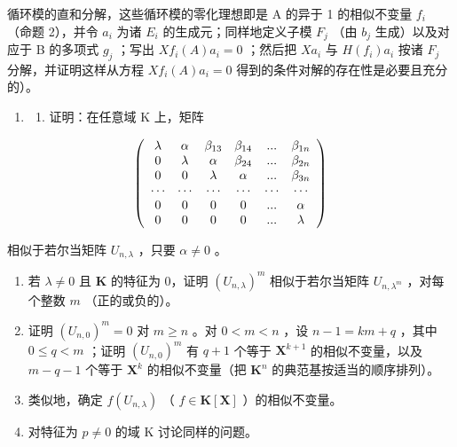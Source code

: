循环模的直和分解，这些循环模的零化理想即是 A 的异于 1 的相似不变量 \(f_{i}\) （命题 2），并令 \(a_{i}\) 为诸 \(E_{i}\) 的生成元；同样地定义子模 \(F_{j}\) （由 \(b_{j}\) 生成）以及对应于 B 的多项式 \(g_{j}\) ；写出 \(Xf_{i}(A)a_{i}=0\) ；然后把 \(Xa_{i}\) 与 \(H(f_{i})a_{i}\) 按诸 \(F_{j}\) 分解，并证明这样从方程 \(Xf_{i}(A)a_{i}=0\) 得到的条件对解的存在性是必要且充分的）。

\begin{enumerate}
\def\labelenumi{\arabic{enumi})}
\setcounter{enumi}{9}
\tightlist
\item
  \begin{enumerate}
  \def\labelenumii{\alph{enumii})}
  \tightlist
  \item
    证明：在任意域 K 上，矩阵
  \end{enumerate}
\end{enumerate}

\[
\left( \begin{array}{c c c c c c} \lambda & \alpha & \beta_ {13} & \beta_ {14} & ... & \beta_ {1n} \\ 0 & \lambda & \alpha & \beta_ {24} & ... & \beta_ {2n} \\ 0 & 0 & \lambda & \alpha & ... & \beta_ {3n} \\ \cdots & \cdots & \cdots & \cdots & \cdots & \cdots \\ 0 & 0 & 0 & 0 & ... & \alpha \\ 0 & 0 & 0 & 0 & ... & \lambda \end{array} \right)
\]

相似于若尔当矩阵 \(U_{n,\lambda}\) ，只要 \(\alpha \neq 0\) 。

\begin{enumerate}
\def\labelenumi{\alph{enumi})}
\setcounter{enumi}{1}
\item
  若 \(\lambda \neq 0\) 且 \(\mathbf{K}\) 的特征为 0，证明 \((U_{n,\lambda})^m\) 相似于若尔当矩阵 \(U_{n,\lambda^m}\) ，对每个整数 \(m\) （正的或负的）。
\item
  证明 \((U_{n,0})^m = 0\) 对 \(m \geqslant n\) 。对 \(0 < m < n\) ，设 \(n - 1 = km + q\) ，其中 \(0 \leqslant q < m\) ；证明 \((U_{n,0})^m\) 有 \(q + 1\) 个等于 \(\mathbf{X}^{k+1}\) 的相似不变量，以及 \(m - q - 1\) 个等于 \(\mathbf{X}^k\) 的相似不变量（把 \(\mathbf{K}^n\) 的典范基按适当的顺序排列）。
\item
  类似地，确定 \(f(U_{n,\lambda})\) （ \(f \in \mathbf{K}[\mathbf{X}]\) ）的相似不变量。
\item
  对特征为 \(p \neq 0\) 的域 K 讨论同样的问题。
\end{enumerate}

